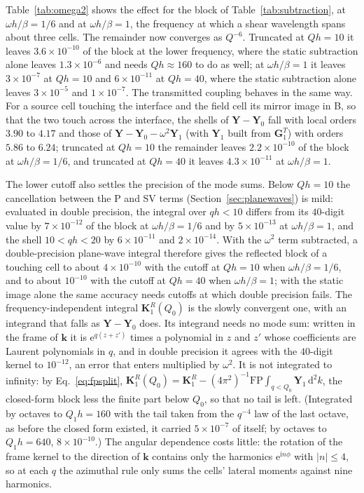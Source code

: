 \documentclass[11pt,a4paper]{article}
\newcommand{\bK}{\mathbf{K}}
\newcommand{\bk}{\mathbf{k}}
\newcommand{\dd}{\mathrm{d}}
\newcommand{\ii}{\mathrm{i}}
\newcommand{\ee}{\mathrm{e}}
\begin{document}
Table~\ref{tab:omega2} shows the effect for the block of Table~\ref{tab:subtraction}, at $\omega h/\beta=1/6$
and at $\omega h/\beta=1$, the frequency at which a shear wavelength spans about three cells. The remainder
now converges as $Q^{-6}$. Truncated at $Qh=10$ it leaves $3.6\times10^{-10}$ of the block at the lower
frequency, where the static subtraction alone leaves $1.3\times10^{-6}$ and needs $Qh\approx160$ to do as well;
at $\omega h/\beta=1$ it leaves $3\times10^{-7}$ at $Qh=10$ and $6\times10^{-11}$ at $Qh=40$, where the static
subtraction alone leaves $3\times10^{-5}$ and $1\times10^{-7}$.
The transmitted coupling behaves in the same way. For a source cell touching the interface and the field
cell its mirror image in B, so that the two touch across the interface, the shells of
$\mathbf Y-\mathbf Y_0$ fall with local orders $3.90$ to $4.17$ and those of
$\mathbf Y-\mathbf Y_0-\omega^2\mathbf Y_1$ (with $\mathbf Y_1$ built from $\mathbf G^{T}_1$) with orders $5.86$
to $6.24$; truncated at $Qh=10$ the remainder leaves $2.2\times10^{-10}$ of the block at $\omega h/\beta=1/6$, and
truncated at $Qh=40$ it leaves $4.3\times10^{-11}$ at $\omega h/\beta=1$.

The lower cutoff also settles the precision of the mode sums. Below $Qh=10$ the cancellation between the P and
SV terms (Section~\ref{sec:planewaves}) is mild: evaluated in double precision, the integral over $qh<10$
differs from its $40$-digit value by $7\times10^{-12}$ of the block at $\omega h/\beta=1/6$ and by
$5\times10^{-13}$ at $\omega h/\beta=1$, and the shell $10<qh<20$ by $6\times10^{-11}$ and $2\times10^{-14}$. With
the $\omega^2$ term subtracted, a double-precision plane-wave integral therefore gives the reflected block of a
touching cell to about $4\times10^{-10}$ with the cutoff at $Qh=10$ when $\omega h/\beta=1/6$, and to about
$10^{-10}$ with the cutoff at $Qh=40$ when $\omega h/\beta=1$; with the static image alone the same accuracy
needs cutoffs at which double precision fails. The frequency-independent integral $\bK^{R}_1(Q_0)$ is the slowly convergent one, with an integrand that falls as
$\mathbf Y-\mathbf Y_0$ does. Its integrand needs no mode sum: written in the frame of $\bk$ it is
$\ee^{q(z+z')}$ times a polynomial in $z$ and $z'$ whose coefficients are Laurent polynomials in $q$, and in
double precision it agrees with the $40$-digit kernel to $10^{-12}$, an error that enters multiplied by
$\omega^2$. It is not integrated to infinity: by Eq.~\eqref{eq:fpsplit},
$\bK^{R}_1(Q_0)=\bK^{R}_1-(4\pi^2)^{-1}\mathrm{FP}\!\int_{q<Q_0}\mathbf Y_1\,\dd^2k$, the closed-form block less
the finite part below $Q_0$, so that no tail is left. (Integrated by octaves to $Q_1h=160$ with the tail taken from
the $q^{-4}$ law of the last octave, as before the closed form existed, it carried $5\times10^{-7}$ of itself;
by octaves to $Q_1h=640$, $8\times10^{-10}$.) The angular dependence costs little: the rotation of the frame kernel to the direction of
$\bk$ contains only the harmonics $\ee^{\ii n\phi}$ with $|n|\le4$, so at each $q$ the azimuthal rule only sums
the cells' lateral moments against nine harmonics.
\end{document}
